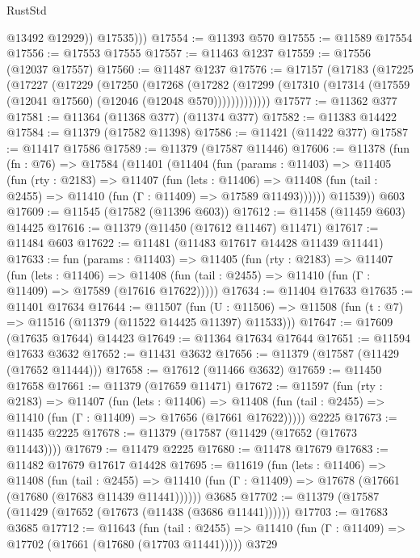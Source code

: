 \begin{lexlean}{RustStd}
\begin{coremodule}
              @13492
              @12929))
          @17535)))
@17554 := @11393 @570
@17555 := @11589 @17554
@17556 := @17553 @17555
@17557 := @11463 @1237
@17559 := @17556 (@12037 @17557)
@17560 := @11487 @1237
@17576 := @17157
    (@17183
      (@17225
        (@17227
          (@17229
            (@17250
              (@17268
                (@17282
                  (@17299 (@17310 (@17314 (@17559 (@12041 @17560) (@12046 (@12048 @570)))))))))))))
@17577 := @11362 @377
@17581 := @11364 (@11368 @377) (@11374 @377)
@17582 := @11383 @14422
@17584 := @11379 (@17582 @11398)
@17586 := @11421 (@11422 @377)
@17587 := @11417 @17586
@17589 := @11379 (@17587 @11446)
@17606 := @11378
    (fun (fn : @76) =>
    @17584
      (@11401
        (@11404
          (fun (params : @11403) =>
          @11405
            (fun (rty : @2183) =>
            @11407
              (fun (lets : @11406) =>
              @11408 (fun (tail : @2455) => @11410 (fun (Γ : @11409) => @17589 @11493))))))
        @11539))
    @603
@17609 := @11545 (@17582 (@11396 @603))
@17612 := @11458 (@11459 @603) @14425
@17616 := @11379 (@11450 (@17612 @11467) @11471)
@17617 := @11484 @603
@17622 := @11481 (@11483 @17617 @14428 @11439 @11441)
@17633 := fun (params : @11403) =>
  @11405
    (fun (rty : @2183) =>
    @11407
      (fun (lets : @11406) =>
      @11408 (fun (tail : @2455) => @11410 (fun (Γ : @11409) => @17589 (@17616 @17622)))))
@17634 := @11404 @17633
@17635 := @11401 @17634
@17644 := @11507
    (fun (U : @11506) => @11508 (fun (t : @7) => @11516 (@11379 (@11522 @14425 @11397) @11533)))
@17647 := @17609 (@17635 @17644) @14423
@17649 := @11364 @17634 @17644
@17651 := @11594 @17633 @3632
@17652 := @11431 @3632
@17656 := @11379 (@17587 (@11429 (@17652 @11444)))
@17658 := @17612 (@11466 @3632)
@17659 := @11450 @17658
@17661 := @11379 (@17659 @11471)
@17672 := @11597
    (fun (rty : @2183) =>
    @11407
      (fun (lets : @11406) =>
      @11408 (fun (tail : @2455) => @11410 (fun (Γ : @11409) => @17656 (@17661 @17622)))))
    @2225
@17673 := @11435 @2225
@17678 := @11379 (@17587 (@11429 (@17652 (@17673 @11443))))
@17679 := @11479 @2225
@17680 := @11478 @17679
@17683 := @11482 @17679 @17617 @14428
@17695 := @11619
    (fun (lets : @11406) =>
    @11408
      (fun (tail : @2455) =>
      @11410 (fun (Γ : @11409) => @17678 (@17661 (@17680 (@17683 @11439 @11441))))))
    @3685
@17702 := @11379 (@17587 (@11429 (@17652 (@17673 (@11438 (@3686 @11441))))))
@17703 := @17683 @3685
@17712 := @11643
    (fun (tail : @2455) => @11410 (fun (Γ : @11409) => @17702 (@17661 (@17680 (@17703 @11441)))))
    @3729

\end{coremodule}
\end{lexlean}
